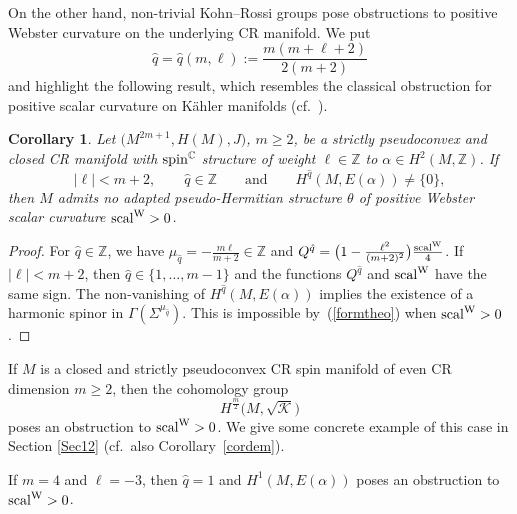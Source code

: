 \documentclass[10pt,a4paper]{amsart}
\numberwithin{equation}{section}
\newtheorem{Corollary}[Theorem]{Corollary}
\newcommand{\ZZ}{\mathbb{Z}}
\newcommand{\CC}{\mathbb{C}}
\begin{document}
On the other hand, non-trivial Kohn--Rossi groups pose obstructions to positive Webster curvature on the underlying CR manifold.
We put
\[
\hat{q}=\hat{q}(m,\ell) := \frac{m(m+\ell+2)}{2(m+2)}
\]
and highlight the following result, which resembles the classical obstruction for positive scalar curvature on K\"ahler manifolds
(cf.~\cite{Hitch, Lich}).

\begin{Corollary} \label{ObsKR} Let $\big(M^{2m+1}, H(M),J\big)$, $m\geq 2$, be a strictly pseudoconvex and closed CR manifold with ${\rm spin}^\CC$ structure
of weight $\ell\in\ZZ$ to $\alpha\in H^2(M,\ZZ)$. If
\[
|\ell|<m+2,\qquad \hat{q}\in\ZZ\qquad\mbox{and}\qquad H^{\hat{q}}(M,E(\alpha)) \neq \{0\},
\]
then $M$ admits no adapted pseudo-Hermitian structure $\theta$ of positive Webster scalar curvature ${\rm scal}^{\rm W}>0$.
\end{Corollary}

\begin{proof} For $\hat{q}\in\ZZ$, we have $\mu_{\hat{q}}=-\frac{m\ell}{m+2}\in\ZZ$ and $Q^{\hat{q}}=\big(1-\frac{\ell^2}{(m+2)^2}\big)\frac{{\rm scal}^{\rm W}}{4}$.
If $|\ell|<m+2$, then $\hat{q}\in\{1,\dots,m-1\}$ and the functions $Q^{\hat{q}}$ and ${\rm scal}^{\rm W}$ have the same sign.
The non-vanishing of $H^{\hat{q}}(M,E(\alpha))$ implies the existence of
a harmonic spinor in $\Gamma(\Sigma^{\mu_{\hat{q}}})$. This is impossible by~(\ref{formtheo}) when ${\rm scal}^{\rm W}>0$.
\end{proof}

\begin{Example} If $M$ is a closed and strictly pseudoconvex CR spin manifold of even CR dimension $m \geq 2$, then
the cohomology group
\[
H^{\frac{m}{2}}\big(M,\sqrt{\mathcal{K}}\big)
\]
poses an obstruction to ${\rm scal}^{\rm W}>0$. We give some concrete example of this case in Section \ref{Sec12} (cf.\ also Corollary~\ref{cordem}).
\end{Example}

\begin{Example} If $m=4$ and $\ell=-3$, then $\hat{q}=1$ and $H^1(M,E(\alpha))$ poses an obstruction to
${\rm scal}^{\rm W}>0$.
\end{Example}
\end{document}
